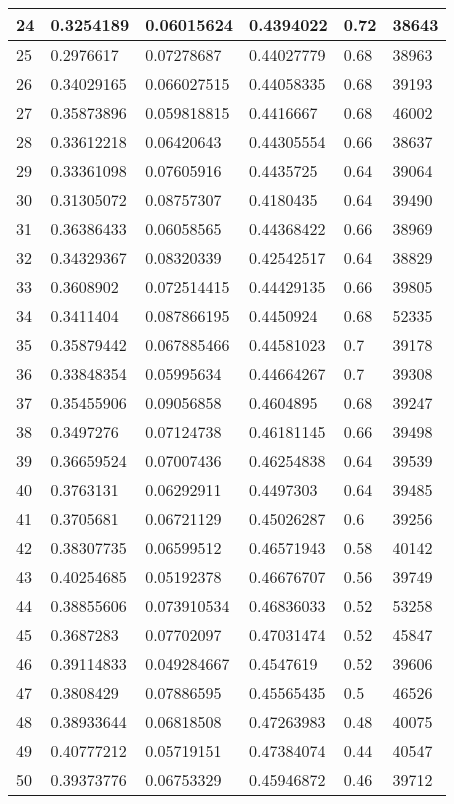 \begin{longtable}{|l|l|l|l|l|l|}
24 & 0.3254189 & 0.06015624 & 0.4394022 & 0.72 & 38643 \\ \hline 
25 & 0.2976617 & 0.07278687 & 0.44027779 & 0.68 & 38963 \\ \hline 
26 & 0.34029165 & 0.066027515 & 0.44058335 & 0.68 & 39193 \\ \hline 
27 & 0.35873896 & 0.059818815 & 0.4416667 & 0.68 & 46002 \\ \hline 
28 & 0.33612218 & 0.06420643 & 0.44305554 & 0.66 & 38637 \\ \hline 
29 & 0.33361098 & 0.07605916 & 0.4435725 & 0.64 & 39064 \\ \hline 
30 & 0.31305072 & 0.08757307 & 0.4180435 & 0.64 & 39490 \\ \hline 
31 & 0.36386433 & 0.06058565 & 0.44368422 & 0.66 & 38969 \\ \hline 
32 & 0.34329367 & 0.08320339 & 0.42542517 & 0.64 & 38829 \\ \hline 
33 & 0.3608902 & 0.072514415 & 0.44429135 & 0.66 & 39805 \\ \hline 
34 & 0.3411404 & 0.087866195 & 0.4450924 & 0.68 & 52335 \\ \hline 
35 & 0.35879442 & 0.067885466 & 0.44581023 & 0.7 & 39178 \\ \hline 
36 & 0.33848354 & 0.05995634 & 0.44664267 & 0.7 & 39308 \\ \hline 
37 & 0.35455906 & 0.09056858 & 0.4604895 & 0.68 & 39247 \\ \hline 
38 & 0.3497276 & 0.07124738 & 0.46181145 & 0.66 & 39498 \\ \hline 
39 & 0.36659524 & 0.07007436 & 0.46254838 & 0.64 & 39539 \\ \hline 
40 & 0.3763131 & 0.06292911 & 0.4497303 & 0.64 & 39485 \\ \hline 
41 & 0.3705681 & 0.06721129 & 0.45026287 & 0.6 & 39256 \\ \hline 
42 & 0.38307735 & 0.06599512 & 0.46571943 & 0.58 & 40142 \\ \hline 
43 & 0.40254685 & 0.05192378 & 0.46676707 & 0.56 & 39749 \\ \hline 
44 & 0.38855606 & 0.073910534 & 0.46836033 & 0.52 & 53258 \\ \hline 
45 & 0.3687283 & 0.07702097 & 0.47031474 & 0.52 & 45847 \\ \hline 
46 & 0.39114833 & 0.049284667 & 0.4547619 & 0.52 & 39606 \\ \hline 
47 & 0.3808429 & 0.07886595 & 0.45565435 & 0.5 & 46526 \\ \hline 
48 & 0.38933644 & 0.06818508 & 0.47263983 & 0.48 & 40075 \\ \hline 
49 & 0.40777212 & 0.05719151 & 0.47384074 & 0.44 & 40547 \\ \hline 
50 & 0.39373776 & 0.06753329 & 0.45946872 & 0.46 & 39712 \\ \hline 
\end{longtable}